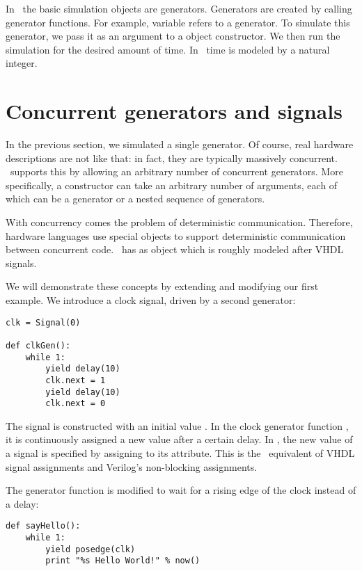 In \myhdl\, the basic simulation objects are generators. Generators
are created by calling generator functions. For example, variable
 refers to a generator. To simulate this generator, we pass
it as an argument to a  object constructor.  We then
run the simulation for the desired amount of time. In \myhdl\, time
is modeled by a natural integer.


\section{Concurrent generators and signals}

In the previous section, we simulated a single generator. Of course,
real hardware descriptions are not like that: in fact, they are
typically massively concurrent. \myhdl\ supports this by allowing an
arbitrary number of concurrent generators. More specifically, a
 constructor can take an arbitrary number of
arguments, each of which can be a generator or a nested sequence of
generators.

With concurrency comes the problem of deterministic
communication. Therefore, hardware languages use special objects to
support deterministic communication between concurrent code. \myhdl\
has as  object which is roughly modeled after VHDL
signals.

We will demonstrate these concepts by extending and modifying our
first example. We introduce a clock signal, driven by a second
generator: 

\begin{verbatim}
clk = Signal(0)

def clkGen():
    while 1:
        yield delay(10)
        clk.next = 1
        yield delay(10)
        clk.next = 0

\end{verbatim}

The  signal is constructed with an initial value
. In the clock generator function , it is
continuously assigned a new value after a certain delay. In \myhdl{},
the new value of a signal is specified by assigning to its
 attribute. This is the \myhdl\ equivalent of VHDL signal
assignments and Verilog's non-blocking assignments.

The  generator function is modified to wait for a
rising edge of the clock instead of a delay:

\begin{verbatim}
def sayHello():
    while 1:
        yield posedge(clk)
        print "%s Hello World!" % now()

\end{verbatim}

